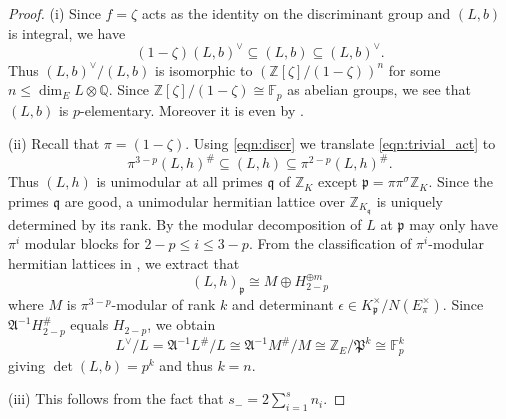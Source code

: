 \documentclass{amsart}
\theoremstyle{definition}
\theoremstyle{plain}
\newcommand{\QQ}{\mathbb{Q}}
\newcommand{\FF}{\mathbb{F}}
\newcommand{\ZZ}{\mathbb{Z}}
\begin{document}
\begin{proof}
(i) Since $f=\zeta$ acts as the identity on the discriminant group and $(L,b)$ is integral, we have
\begin{equation}\label{eqn:trivial_act}
(1-\zeta) (L,b)^\vee \subseteq (L,b)\subseteq (L,b)^\vee.
\end{equation}
Thus $(L,b)^\vee / (L,b)$ is isomorphic to $(\ZZ[\zeta]/ (1-\zeta))^n$ for some $n \leq \dim_E L\otimes \QQ$.
Since  $\ZZ[\zeta]/ (1-\zeta) \cong \FF_p$ as abelian groups, we see that $(L,b)$ is $p$-elementary. Moreover
it is even by .

(ii) Recall that $\pi = (1-\zeta)$.
Using \cref{eqn:discr} we translate \cref{eqn:trivial_act} to
\begin{equation}\label{eq-disc_bound}
\pi^{3-p}(L,h)^\# \subseteq  (L,h) \subseteq \pi^{2-p} (L,h)^\#.
\end{equation}
Thus $(L,h)$ is unimodular at all primes $\mathfrak{q}$ of $\ZZ_K$ except $\mathfrak{p}=\pi \pi^\sigma \ZZ_K$.
Since the primes $\mathfrak{q}$ are good, a unimodular hermitian lattice over $\ZZ_{K_\mathfrak{q}}$ is uniquely determined by its rank.
By  the modular decomposition of $L$ at $\mathfrak{p}$ may only have $\pi^i$ modular blocks for $2-p \leq i \leq 3-p$.
From the classification of $\pi^i$-modular hermitian lattices in  , we extract that
\[(L,h)_\mathfrak{p} \cong M \oplus H_{2-p}^{\oplus m}\]
where $M$ is $\pi^{3-p}$-modular of rank $k$ and determinant $\epsilon \in K_\mathfrak{p}^\times / N(E_\pi^\times)$.
Since $\mathfrak{A}^{-1}H_{2-p}^\#$ equals $H_{2-p}$, we obtain
\[L^\vee/L=\mathfrak{A}^{-1} L^\# / L \cong \mathfrak{A}^{-1}M^\#/M \cong \ZZ_E/\mathfrak{P}^k\cong \FF_p^k\] giving $\det (L,b) = p^k$ and thus $k=n$.

(iii) This follows from the fact that $s_- = 2 \sum_{i=1}^s n_i$.


\end{proof}
\end{document}
